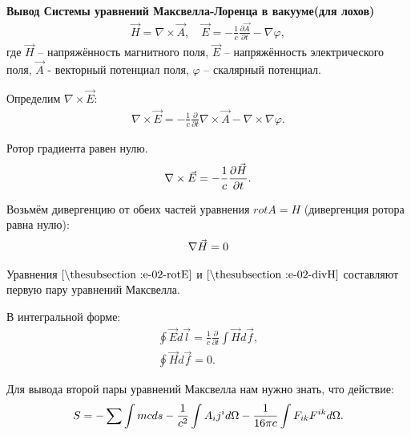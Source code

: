 \documentclass[__main__.tex]{subfiles}
\begin{document}
\textbf{Вывод Системы уравнений Максвелла-Лоренца в вакууме(для лохов)}\\

\begin{gather*}
    \vec{H}=\nabla\times\vec{A},
    \quad
    \vec{E}=-\frac{1}{c}\frac{\partial\vec{A}}{\partial t}-\nabla\varphi,
\end{gather*}
где $\vec{H}$ -- напряжённость магнитного поля, $\vec{E}$ -- напряжённость электрического поля, $\vec{A}$ - векторный потенциал поля, $\varphi$ -- скалярный потенциал.

Определим $\nabla\times\vec{E}$:
\begin{gather*}
    \nabla\times\vec{E}=-\frac{1}{c}\frac{\partial}{\partial t}\nabla\times\vec{A}-\nabla\times\nabla\varphi.
\end{gather*}

Ротор градиента равен нулю.
\begin{gather}
    \llabel{e-02-rotE}
    \nabla\times\vec{E}=-\frac{1}{c}\frac{\partial\vec{H}}{\partial t}.
\end{gather}

Возьмём дивергенцию от обеих частей уравнения $rot A = H$ (дивергенция ротора равна нулю):
\begin{gather}
    \llabel{e-02-divH}
    \nabla\vec{H}=0
\end{gather}

Уравнения $\lref{e-02-rotE}$ и  $\lref{e-02-divH}$ составляют первую пару уравнений Максвелла.

В интегральной форме:
\begin{gather*}
    \oint\vec{E}d\vec{l}
    =
    \frac{1}{c}\frac{\partial}{\partial t}\int\vec{H}d\vec{f},\\
    \oint\vec{H}d\vec{f}=0.
\end{gather*}

Для вывода второй пары уравнений Максвелла нам нужно знать, что действие:
\begin{gather}
    \llabel{e-02-S}
    S = -\sum\int mcds - \frac{1}{c^2}\int A_ij^id\Omega - \frac{1}{16\pi c}\int F_{ik}F^{ik}d\Omega.
\end{gather}
\end{document}
